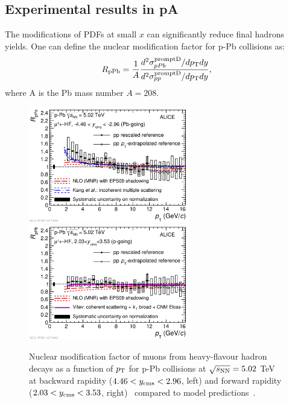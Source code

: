 \subsection{Experimental results in pA}
The modifications of PDFs at small $x$ can significantly reduce final hadrons yields.
One can define the nuclear modification factor for p-Pb collisions as:
\begin{equation}
R_{\rm pPb} = \frac{1}{A}\frac{d^2\sigma_{pPb}^{\rm prompt D}/dp_{\rm T} dy}{d^2\sigma_{pp}^{\rm prompt D}/dp_{\rm T} dy},
\end{equation}
where A is the Pb mass number $A = 208$. \\
\begin{figure}[!ht]
  \centering
  \includegraphics[width=7cm]{FigCap2/2017-Feb-05-Fig2b.pdf}
  \includegraphics[width=7cm]{FigCap2/2017-Feb-05-Fig2a.pdf}
  \caption{Nuclear modification factor of muons from heavy-flavour hadron decays as a function of $p_{\rm T}$ for p-Pb collisions at $\sqrt{s_{\rm NN}} = 5.02$ TeV at backward rapidity ($4.46 < y_{\rm cms} < 2.96$, left) and forward rapidity ($2.03 < y_{\rm cms} < 3.53$, right)~\cite{Acharya:2017hdv} compared to model predictions~\cite{Kang:2014hha,Mangano:1991jk}. }
  \label{fig:muons}
\end{figure}
